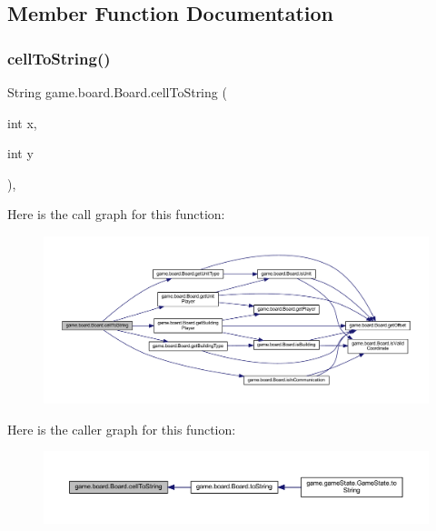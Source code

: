 \subsection{Member Function Documentation}
\mbox{\label{classgame_1_1board_1_1_board_a5725709db18e36c737861fd396faa517}} 
\subsubsection{\texorpdfstring{cell\+To\+String()}{cellToString()}}
{\footnotesize\ttfamily String game.\+board.\+Board.\+cell\+To\+String (\begin{DoxyParamCaption}\item[{int}]{x,  }\item[{int}]{y }\end{DoxyParamCaption})\hspace{0.3cm}{\ttfamily [inline]}, {\ttfamily [private]}}

Here is the call graph for this function\+:
\nopagebreak
\begin{figure}[H]
\begin{center}
\leavevmode
\includegraphics[width=350pt]{classgame_1_1board_1_1_board_a5725709db18e36c737861fd396faa517_cgraph}
\end{center}
\end{figure}
Here is the caller graph for this function\+:
\nopagebreak
\begin{figure}[H]
\begin{center}
\leavevmode
\includegraphics[width=350pt]{classgame_1_1board_1_1_board_a5725709db18e36c737861fd396faa517_icgraph}
\end{center}
\end{figure}
\mbox{\label{classgame_1_1board_1_1_board_ab0f2fd4d06d165a3eb180023480f1421}} 
